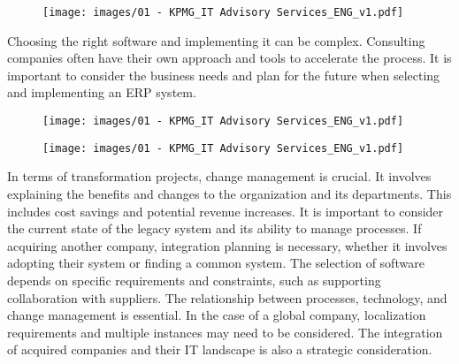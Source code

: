 \begin{figure}[!h]
    \centering
    \texttt{[image: images/01 - KPMG\_IT Advisory Services\_ENG\_v1.pdf]}
\end{figure}

Choosing the right software and implementing it can be complex.
Consulting companies often have their own approach and tools to
accelerate the process. It is important to consider the business needs
and plan for the future when selecting and implementing an ERP system.

\begin{figure}[!h]
    \centering
    \texttt{[image: images/01 - KPMG\_IT Advisory Services\_ENG\_v1.pdf]}
\end{figure}

\begin{figure}[!h]
    \centering
    \texttt{[image: images/01 - KPMG\_IT Advisory Services\_ENG\_v1.pdf]}
\end{figure}

In terms of transformation projects, change management is crucial. It
involves explaining the benefits and changes to the organization and its
departments. This includes cost savings and potential revenue increases.
It is important to consider the current state of the legacy system and
its ability to manage processes. If acquiring another company,
integration planning is necessary, whether it involves adopting their
system or finding a common system. The selection of software depends on
specific requirements and constraints, such as supporting collaboration
with suppliers. The relationship between processes, technology, and
change management is essential. In the case of a global company,
localization requirements and multiple instances may need to be
considered. The integration of acquired companies and their IT landscape
is also a strategic consideration.